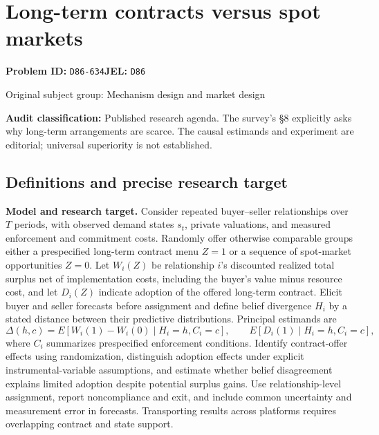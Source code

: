 \documentclass[11pt,a4paper]{article}
\begin{document}
\section*{Long-term contracts versus spot markets}
\textbf{Problem ID:} \texttt{D86-634}\quad \textbf{JEL:} \texttt{D86}\par
\label{problem:OP-0293}
{\sffamily\small\color{muted}Original subject group: Mechanism design and market design\par}
\label{definitions:problem:30007575}
\textbf{Audit classification:} Published research agenda. The survey’s §8 explicitly asks why long-term arrangements are scarce. The causal estimands and experiment are editorial; universal superiority is not established.
\subsection*{Definitions and precise research target}
\textbf{Model and research target.} Consider repeated buyer–seller relationships over \(T\) periods, with observed demand states \(s_t\), private valuations, and measured enforcement and commitment costs. Randomly offer otherwise comparable groups either a prespecified long-term contract menu \(Z=1\) or a sequence of spot-market opportunities \(Z=0\). Let \(W_i(Z)\) be relationship \(i\)'s discounted realized total surplus net of implementation costs, including the buyer's value minus resource cost, and let \(D_i(Z)\) indicate adoption of the offered long-term contract. Elicit buyer and seller forecasts before assignment and define belief divergence \(H_i\) by a stated distance between their predictive distributions. Principal estimands are
\[
 \Delta(h,c)=E[W_i(1)-W_i(0)\mid H_i=h,C_i=c],
 \qquad E[D_i(1)\mid H_i=h,C_i=c],
\]
where \(C_i\) summarizes prespecified enforcement conditions. Identify contract-offer effects using randomization, distinguish adoption effects under explicit instrumental-variable assumptions, and estimate whether belief disagreement explains limited adoption despite potential surplus gains. Use relationship-level assignment, report noncompliance and exit, and include common uncertainty and measurement error in forecasts. Transporting results across platforms requires overlapping contract and state support.
\end{document}
